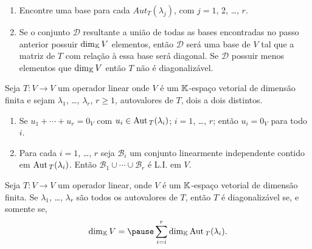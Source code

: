 \documentclass{beamer}
\begin{document}
    \begin{frame}
        \begin{enumerate}[label={\arabic*})]
        \conti
            \item Encontre uma base para cada $Aut_T(\lambda_j)$, \pause com $j = 1$, 2, \dots, $r$.\pause

            \vspace*{1cm}

            \item Se o conjunto $\mathcal{D}$ \pause resultante a união de todas as bases encontradas no passo anterior \pause
                possuir $\dim_{\mathbb{K}}V$ elementos, \pause então $\mathcal{D}$ será uma base de $V$ \pause tal que a matriz de $T$ com
                relação à essa base será diagonal. \pause Se $\mathcal{D}$ possuir menos elementos que $\dim_{\mathbb{K}}V$ \pause então $T$
                não é diagonalizável.
        \end{enumerate}
    \end{frame}

    \begin{frame}
        \begin{teorema}
            Seja $T : V \to V$ um operador linear \pause onde $V$ é um $\mathbb{K}$-espaço vetorial de dimensão finita \pause e sejam
            $\lambda_1$, \pause \dots, \pause $\lambda_r$, \pause $r \ge 1$, autovalores de $T$, \pause dois a dois distintos.\pause
            \begin{enumerate}[label={\roman*})]
                \item\label{autovetorLI} Se $u_1 + \cdots + u_r = 0_V$ \pause com $u_i \in {\rm Aut\,}_T(\lambda_i)$; \pause $i = 1$, \dots,
                    $r$; \pause então $u_i = 0_V$ \pause para todo $i$.\pause

                \vspace*{1cm}

                \item Para cada $i = 1$, \dots, $r$ \pause seja $\mathcal{B}_i$ \pause um conjunto linearmente independente \pause
                    contido em ${\rm Aut\,}_T(\lambda_i)$. \pause Então $\mathcal{B}_1 \cup \cdots \cup \mathcal{B}_r$ \pause é L.I. em $V$.
            \end{enumerate}
        \end{teorema}
    \end{frame}

    \begin{frame}
        \begin{corolario}
            Seja $T : V \to V$ um operador linear, \pause onde $V$ é um $\mathbb{K}$-espaço vetorial \pause de dimensão finita. \pause Se
            $\lambda_1$, \pause \dots, \pause $\lambda_r$ \pause são todos os autovalores de $T$, \pause então $T$ é diagonalizável
            \pause se, e somente se,\pause
            \[
                \dim_\cp{K} V = \pause \sum_{i = i}^r\dim_\cp{K}\aut_T(\lambda_i).
            \]
        \end{corolario}
    \end{frame}
\end{document}
